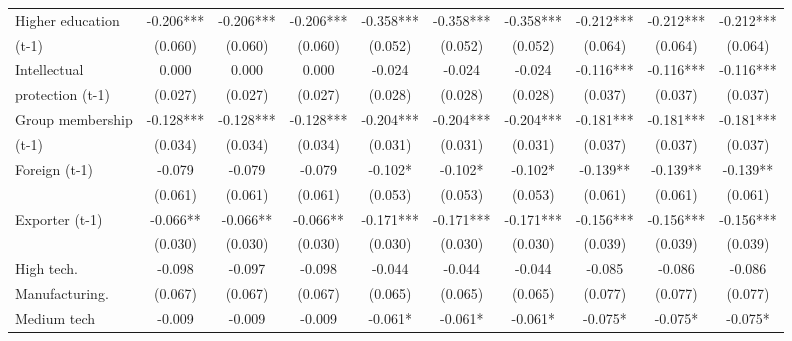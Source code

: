 \begin{table}[htbp]
\begin{tabular}{l*{9}{c}}
Higher education    &      -0.206***&      -0.206***&      -0.206***&      -0.358***&      -0.358***&      -0.358***&      -0.212***&      -0.212***&      -0.212***\\
(t-1)               &     (0.060)   &     (0.060)   &     (0.060)   &     (0.052)   &     (0.052)   &     (0.052)   &     (0.064)   &     (0.064)   &     (0.064)   \\
Intellectual        &       0.000   &       0.000   &       0.000   &      -0.024   &      -0.024   &      -0.024   &      -0.116***&      -0.116***&      -0.116***\\
protection (t-1)    &     (0.027)   &     (0.027)   &     (0.027)   &     (0.028)   &     (0.028)   &     (0.028)   &     (0.037)   &     (0.037)   &     (0.037)   \\
Group membership    &      -0.128***&      -0.128***&      -0.128***&      -0.204***&      -0.204***&      -0.204***&      -0.181***&      -0.181***&      -0.181***\\
(t-1)               &     (0.034)   &     (0.034)   &     (0.034)   &     (0.031)   &     (0.031)   &     (0.031)   &     (0.037)   &     (0.037)   &     (0.037)   \\
Foreign (t-1)       &      -0.079   &      -0.079   &      -0.079   &      -0.102*  &      -0.102*  &      -0.102*  &      -0.139** &      -0.139** &      -0.139** \\
                    &     (0.061)   &     (0.061)   &     (0.061)   &     (0.053)   &     (0.053)   &     (0.053)   &     (0.061)   &     (0.061)   &     (0.061)   \\
Exporter (t-1)      &      -0.066** &      -0.066** &      -0.066** &      -0.171***&      -0.171***&      -0.171***&      -0.156***&      -0.156***&      -0.156***\\
                    &     (0.030)   &     (0.030)   &     (0.030)   &     (0.030)   &     (0.030)   &     (0.030)   &     (0.039)   &     (0.039)   &     (0.039)   \\
High tech.          &      -0.098   &      -0.097   &      -0.098   &      -0.044   &      -0.044   &      -0.044   &      -0.085   &      -0.086   &      -0.086   \\
Manufacturing.      &     (0.067)   &     (0.067)   &     (0.067)   &     (0.065)   &     (0.065)   &     (0.065)   &     (0.077)   &     (0.077)   &     (0.077)   \\
Medium tech         &      -0.009   &      -0.009   &      -0.009   &      -0.061*  &      -0.061*  &      -0.061*  &      -0.075*  &      -0.075*  &      -0.075*  \\

\end{tabular}
\end{table}
